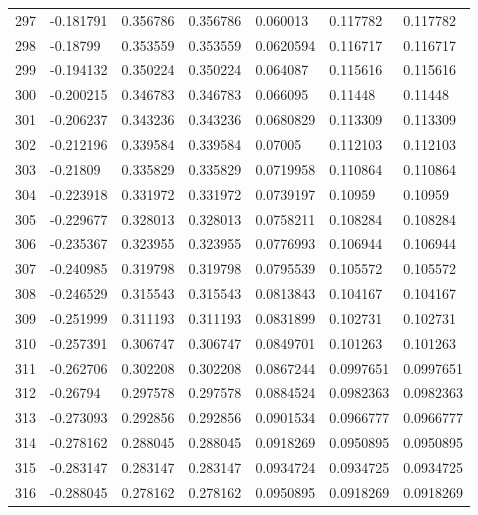 \begin{longtable}{l|lll|lll}
 297 & -0.181791    & 0.356786    & 0.356786    &  0.060013    & 0.117782    & 0.117782    \\
 298 & -0.18799     & 0.353559    & 0.353559    &  0.0620594   & 0.116717    & 0.116717    \\
 299 & -0.194132    & 0.350224    & 0.350224    &  0.064087    & 0.115616    & 0.115616    \\
 300 & -0.200215    & 0.346783    & 0.346783    &  0.066095    & 0.11448     & 0.11448     \\
 301 & -0.206237    & 0.343236    & 0.343236    &  0.0680829   & 0.113309    & 0.113309    \\
 302 & -0.212196    & 0.339584    & 0.339584    &  0.07005     & 0.112103    & 0.112103    \\
 303 & -0.21809     & 0.335829    & 0.335829    &  0.0719958   & 0.110864    & 0.110864    \\
 304 & -0.223918    & 0.331972    & 0.331972    &  0.0739197   & 0.10959     & 0.10959     \\
 305 & -0.229677    & 0.328013    & 0.328013    &  0.0758211   & 0.108284    & 0.108284    \\
 306 & -0.235367    & 0.323955    & 0.323955    &  0.0776993   & 0.106944    & 0.106944    \\
 307 & -0.240985    & 0.319798    & 0.319798    &  0.0795539   & 0.105572    & 0.105572    \\
 308 & -0.246529    & 0.315543    & 0.315543    &  0.0813843   & 0.104167    & 0.104167    \\
 309 & -0.251999    & 0.311193    & 0.311193    &  0.0831899   & 0.102731    & 0.102731    \\
 310 & -0.257391    & 0.306747    & 0.306747    &  0.0849701   & 0.101263    & 0.101263    \\
 311 & -0.262706    & 0.302208    & 0.302208    &  0.0867244   & 0.0997651   & 0.0997651   \\
 312 & -0.26794     & 0.297578    & 0.297578    &  0.0884524   & 0.0982363   & 0.0982363   \\
 313 & -0.273093    & 0.292856    & 0.292856    &  0.0901534   & 0.0966777   & 0.0966777   \\
 314 & -0.278162    & 0.288045    & 0.288045    &  0.0918269   & 0.0950895   & 0.0950895   \\
 315 & -0.283147    & 0.283147    & 0.283147    &  0.0934724   & 0.0934725   & 0.0934725   \\
 316 & -0.288045    & 0.278162    & 0.278162    &  0.0950895   & 0.0918269   & 0.0918269   \\

\end{longtable}
